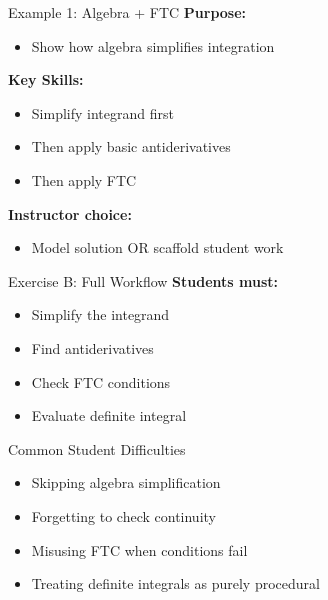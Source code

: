 \documentclass[dvipsnames]{beamer}
\begin{document}

\begin{frame}{Example 1: Algebra + FTC}
\textbf{Purpose:}
\begin{itemize}
\item Show how algebra simplifies integration
\end{itemize}

\vspace{1em}

\textbf{Key Skills:}
\begin{itemize}
\item Simplify integrand first
\item Then apply basic antiderivatives
\item Then apply FTC
\end{itemize}

\vspace{1em}

\textbf{Instructor choice:}
\begin{itemize}
\item Model solution OR scaffold student work
\end{itemize}
\end{frame}


\begin{frame}{Exercise B: Full Workflow}
\textbf{Students must:}
\begin{itemize}
\item Simplify the integrand
\item Find antiderivatives
\item Check FTC conditions
\item Evaluate definite integral
\end{itemize}

\vspace{1em}
\end{frame}

\begin{frame}{Common Student Difficulties}
\begin{itemize}
\item Skipping algebra simplification
\item Forgetting to check continuity
\item Misusing FTC when conditions fail
\item Treating definite integrals as purely procedural
\end{itemize}
\end{frame}
\end{document}
